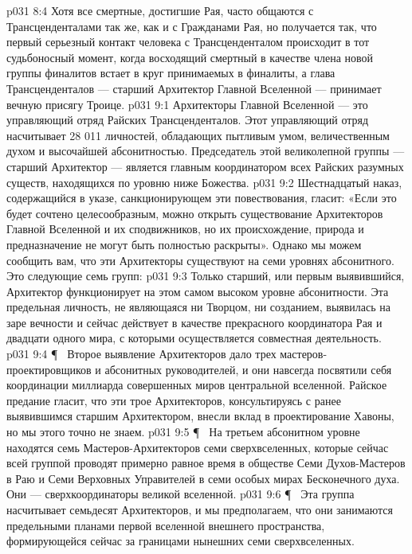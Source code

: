 \vs p031 8:4 Хотя все смертные, достигшие Рая, часто общаются с Трансценденталами так же, как и с Гражданами Рая, но получается так, что первый серьезный контакт человека с Трансценденталом происходит в тот судьбоносный момент, когда восходящий смертный в качестве члена новой группы финалитов встает в круг принимаемых в финалиты, а глава Трансценденталов --- старший Архитектор Главной Вселенной --- принимает вечную присягу Троице.
\vs p031 9:1 Архитекторы Главной Вселенной --- это управляющий отряд Райских Трансценденталов. Этот управляющий отряд насчитывает 28 011 личностей, обладающих пытливым умом, величественным духом и высочайшей абсонитностью. Председатель этой великолепной группы --- старший Архитектор --- является главным координатором всех Райских разумных существ, находящихся по уровню ниже Божества.
\vs p031 9:2 Шестнадцатый наказ, содержащийся в указе, санкционирующем эти повествования, гласит: «Если это будет сочтено целесообразным, можно открыть существование Архитекторов Главной Вселенной и их сподвижников, но их происхождение, природа и предназначение не могут быть полностью раскрыты». Однако мы можем сообщить вам, что эти Архитекторы существуют на семи уровнях абсонитного. Это следующие семь групп:
\vs p031 9:3 \bibnobreakspace {} Только старший, или первым выявившийся, Архитектор функционирует на этом самом высоком уровне абсонитности. Эта предельная личность, не являющаяся ни Творцом, ни созданием, выявилась на заре вечности и сейчас действует в качестве прекрасного координатора Рая и двадцати одного мира, с которыми осуществляется совместная деятельность.
\vs p031 9:4 \P\ \bibnobreakspace {} Второе выявление Архитекторов дало трех мастеров\hyp{}проектировщиков и абсонитных руководителей, и они навсегда посвятили себя координации миллиарда совершенных миров центральной вселенной. Райское предание гласит, что эти трое Архитекторов, консультируясь с ранее выявившимся старшим Архитектором, внесли вклад в проектирование Хавоны, но мы этого точно не знаем.
\vs p031 9:5 \P\ \bibnobreakspace {} На третьем абсонитном уровне находятся семь Мастеров\hyp{}Архитекторов семи сверхвселенных, которые сейчас всей группой проводят примерно равное время в обществе Семи Духов\hyp{}Мастеров в Раю и Семи Верховных Управителей в семи особых мирах Бесконечного духа. Они --- сверхкоординаторы великой вселенной.
\vs p031 9:6 \P\ \bibnobreakspace {} Эта группа насчитывает семьдесят Архитекторов, и мы предполагаем, что они занимаются предельными планами первой вселенной внешнего пространства, формирующейся сейчас за границами нынешних семи сверхвселенных.

